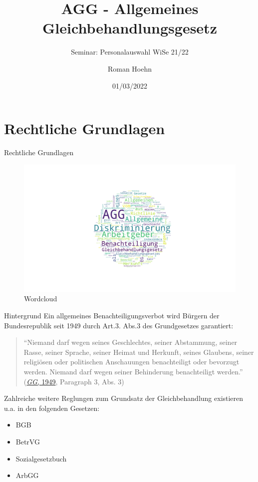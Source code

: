\documentclass[
  10pt,
  ignorenonframetext,
]{beamer}
\title{AGG - Allgemeines Gleichbehandlungsgesetz}
\subtitle{Seminar: Personalauswahl WiSe 21/22}
\author{Roman Hoehn}
\date{01/03/2022}
\providecommand{\tightlist}{%
  \setlength{\itemsep}{0pt}\setlength{\parskip}{0pt}}
\begin{document}
\frame{\titlepage}

\begin{frame}[allowframebreaks]
  \tableofcontents[hideallsubsections]
\end{frame}
\hypertarget{rechtliche-grundlagen}{%
\section{Rechtliche Grundlagen}\label{rechtliche-grundlagen}}

\begin{frame}{Rechtliche Grundlagen}
\begin{figure}
\centering
\includegraphics{plots/fig1.png}
\caption{Wordcloud}
\end{figure}
\end{frame}

\begin{frame}{Hintergrund}
\protect\hypertarget{hintergrund}{}
Ein allgemeines Benachteiligungsverbot wird Bürgern der Bundesrepublik
seit 1949 durch Art.3. Abs.3 des Grundgesetzes garantiert:

\begin{quote}
``Niemand darf wegen seines Geschlechtes, seiner Abstammung, seiner
Rasse, seiner Sprache, seiner Heimat und Herkunft, seines Glaubens,
seiner religiösen oder politischen Anschauungen benachteiligt oder
bevorzugt werden. Niemand darf wegen seiner Behinderung benachteiligt
werden.'' (\protect\hyperlink{ref-gg}{\emph{GG}, 1949}, Paragraph 3,
Abs. 3)
\end{quote}

Zahlreiche weitere Reglungen zum Grundsatz der Gleichbehandlung
existieren u.a. in den folgenden Gesetzen:

\begin{itemize}
\tightlist
\item
  BGB
\item
  BetrVG
\item
  Sozialgesetzbuch
\item
  ArbGG
\end{itemize}
\end{frame}
\end{document}

